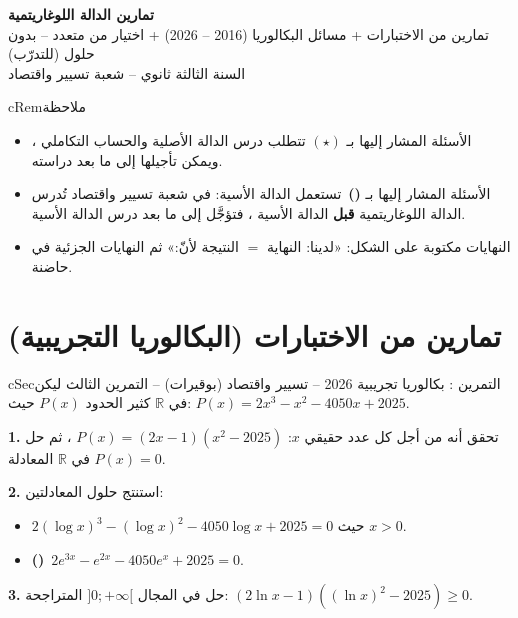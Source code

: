 \documentclass[12pt,a4paper]{article}
\newenvironment{BOX}[2]{\begin{otherlanguage}{english}\begin{arbox}{#1}{#2}}{\end{arbox}\end{otherlanguage}}
\newenvironment{molahada}[1][ملاحظة]{\begin{BOX}{cRem}{#1}}{\end{BOX}}
\newcounter{exo}
\newenvironment{tamrin}[1]{\stepcounter{exo}\begin{BOX}{cSec}{التمرين \theexo: #1}}{\end{BOX}}
\newenvironment{LTR}{\begin{otherlanguage}{english}}{\end{otherlanguage}}
\newcommand{\R}{\mathbb{R}}
\newenvironment{sq}{\begin{itemize}[leftmargin=2.4em,itemsep=3pt]}{\end{itemize}}
\newcommand{\qa}{\item[(أ)]}\newcommand{\qb}{\item[(ب)]}\newcommand{\qc}{\item[(جـ)]}\newcommand{\qd}{\item[(د)]}\newcommand{\qe}{\item[(هـ)]}
\newcommand{\QQ}[1]{\par\smallskip\textbf{#1.} }
\newcommand{\EXP}{\textcolor{cThm}{\textbf{(\ding{72}\ding{72})}}}
\begin{document}
\begin{LTR}
\begin{tcolorbox}[enhanced,colback=cSec,colframe=cSec,arc=3mm,halign=center,boxrule=0pt,top=12pt,bottom=12pt,before upper={\selectlanguage{arabic}}]
{\color{white}\fontsize{28}{34}\selectfont\bfseries تمارين الدالة اللوغاريتمية}\\[8pt]
{\color{white}\large تمارين من الاختبارات + مسائل البكالوريا (2016 -- 2026) + اختيار من متعدد  -- بدون حلول (للتدرّب)}\\[5pt]
{\color{white}\large السنة الثالثة ثانوي -- شعبة تسيير واقتصاد}
\end{tcolorbox}
\end{LTR}

\begin{molahada}
\begin{itemize}
\item الأسئلة المشار إليها بـ $(\star)$ تتطلب درس الدالة الأصلية والحساب التكاملي ، ويمكن تأجيلها إلى ما بعد دراسته.
\item الأسئلة المشار إليها بـ \EXP\ تستعمل الدالة الأسية: في شعبة تسيير واقتصاد تُدرس الدالة اللوغاريتمية \textbf{قبل} الدالة الأسية ، فتؤجَّل إلى ما بعد درس الدالة الأسية.
\item النهايات مكتوبة على الشكل: «لدينا: النهاية $=$ النتيجة لأنّ:» ثم النهايات الجزئية في حاضنة.
\end{itemize}
\end{molahada}

\section{تمارين من الاختبارات (البكالوريا التجريبية)}

\begin{tamrin}{بكالوريا تجريبية 2026 -- تسيير واقتصاد (بوقيرات) -- التمرين الثالث}
ليكن في $\R$ كثير الحدود $P(x)$ حيث: $P(x)=2x^3-x^2-4050x+2025$.
\QQ{1} تحقق أنه من أجل كل عدد حقيقي $x$: $P(x)=(2x-1)\left(x^2-2025\right)$ ، ثم حل في $\R$ المعادلة $P(x)=0$.
\QQ{2} استنتج حلول المعادلتين:
\begin{sq}
\qa $2(\log x)^3-(\log x)^2-4050\log x+2025=0$ حيث $x>0$.
\qb \EXP\ $2e^{3x}-e^{2x}-4050e^x+2025=0$.
\end{sq}
\QQ{3} حل في المجال $]0;+\infty[$ المتراجحة: $(2\ln x-1)\left((\ln x)^2-2025\right)\geqslant0$.
\end{tamrin}
\end{document}
